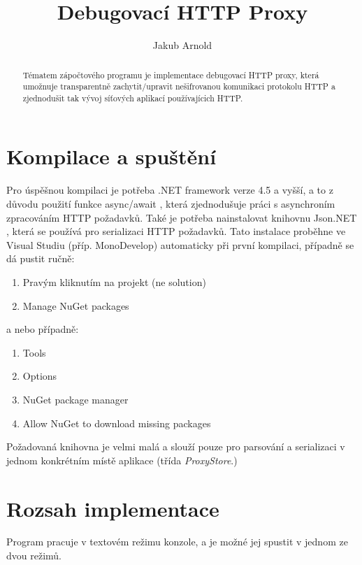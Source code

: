 \documentclass{article}
\title{Debugovací HTTP Proxy}
\author{Jakub Arnold}
\date{}
\begin{document}
\maketitle

\begin{abstract}
	Tématem zápočtového programu je implementace debugovací HTTP proxy, která umožnuje transparentně
	zachytit/upravit nešifrovanou komunikaci protokolu HTTP a zjednodušit tak vývoj síťových aplikací používajícich HTTP.
\end{abstract}

\section{Kompilace a spuštění}

Pro úspěšnou kompilaci je potřeba .NET framework verze 4.5 a vyšší, a to z důvodu použití funkce async/await \cite{async}, která zjednodušuje práci s asynchroním zpracováním HTTP požadavků. Také je potřeba nainstalovat knihovnu Json.NET \cite{newtonsoft}, která se používá pro serializaci HTTP požadavků. Tato instalace proběhne ve Visual Studiu (příp. MonoDevelop) automaticky při první kompilaci, případně se dá pustit ručně:

\begin{enumerate}
	\item Pravým kliknutím na projekt (ne solution)
	\item Manage NuGet packages
\end{enumerate}

a nebo případně:

\begin{enumerate}
	\item Tools
	\item Options
	\item NuGet package manager
	\item Allow NuGet to download missing packages
\end{enumerate}

Požadovaná knihovna je velmi malá a slouží pouze pro parsování a serializaci v jednom konkrétním místě aplikace (třída \emph{ProxyStore}.)

\section{Rozsah implementace}

Program pracuje v textovém režimu konzole, a je možné jej spustit v jednom ze dvou režimů.
\end{document}
